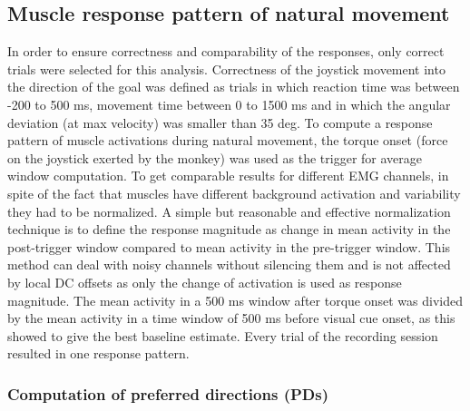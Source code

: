 % 
\subsection{Muscle response pattern of natural movement} %
\label{sg:sub:natural_movement}
In order to ensure correctness and comparability of the responses, only correct trials were selected for this analysis. Correctness of the joystick movement into the direction of the goal was defined as trials in which reaction time was between -200 to 500 ms, movement time between 0 to 1500 ms and in which the angular deviation (at max velocity) was smaller than 35 deg. 
To compute a response pattern of muscle activations during natural movement, the torque onset (force on the joystick exerted by the monkey) was used as the trigger for average window computation. To get comparable results for different EMG channels, in spite of the fact that muscles have different background activation and variability they had to be normalized. A simple but reasonable and effective normalization technique is to define the response magnitude as change in mean activity in the post-trigger window compared to mean activity in the pre-trigger window. This method can deal with noisy channels without silencing them and is not affected by local DC offsets as only the change of activation is used as response magnitude. The mean activity in a 500 ms window after torque onset was divided by the mean activity in a time window of 500 ms before visual cue onset, as this showed to give the best baseline estimate. Every trial of the recording session resulted in one response pattern. 


\subsubsection{Computation of preferred directions (PDs)} %
\label{sg:ssub:pds}

